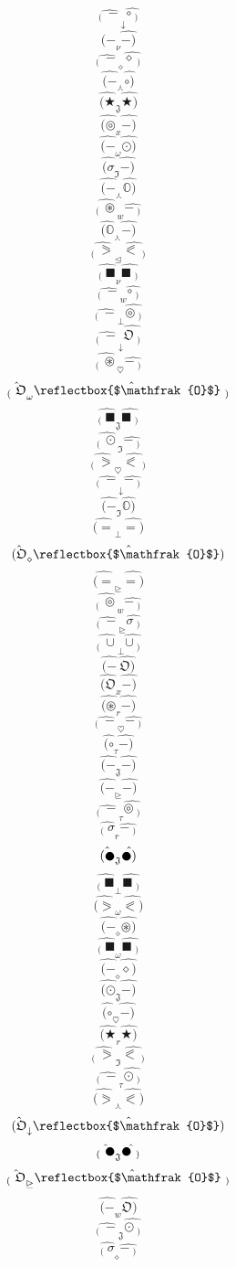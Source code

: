 \documentclass[12pt]{article}
\begin{document}
\begin{multicols}{5}
$$\hat{_( \ -} _\downarrow \hat{\circ\ _)}$$
$$\hat{(-} _\nu \hat{-)}$$
$$\hat{_( \ -} _\diamond \hat{\diamond\ _)}$$
$$\hat{(-} _\curlywedge \hat{\circ)}$$
$$\hat{(\bigstar} _\mathfrak{J} \hat{\bigstar)}$$
$$\hat{(\circledcirc} _x \hat{-)}$$
$$\hat{(-} _\omega \hat{\odot)}$$
$$\hat{(\sigma} _\mathfrak{I} \hat{-)}$$
$$\hat{(-} _\curlywedge \hat{\mathbb{O})}$$
$$\hat{_( \ \circledast} _w \hat{-\ _)}$$
$$\hat{(\mathbb{O}} _\curlywedge \hat{-)}$$
$$\hat{_( \ \eqslantgtr} _\trianglelefteq \hat{\eqslantless\ _)}$$
$$\hat{_( \ \blacksquare} _\nu \hat{\blacksquare\ _)}$$
$$\hat{_( \ -} _w \hat{\circ\ _)}$$
$$\hat{_( \ -} _\bot \hat{\circledcirc\ _)}$$
$$\hat{_( \ -} _\downarrow \hat{\mathfrak{O}\ _)}$$
$$\hat{_( \ \circledast} _\heartsuit \hat{-\ _)}$$
$$\hat{_( \ \mathfrak{O}} _\omega \hat{\reflectbox{$\mathfrak{O}$}\ _)}$$
$$\hat{_( \ \blacksquare} _\mathfrak{J} \hat{\blacksquare\ _)}$$
$$\hat{_( \ \odot} _\mathfrak{I} \hat{-\ _)}$$
$$\hat{_( \ \eqslantgtr} _\heartsuit \hat{\eqslantless\ _)}$$
$$\hat{_( \ -} _\downarrow \hat{-\ _)}$$
$$\hat{(-} _\mathfrak{I} \hat{\mathbb{O})}$$
$$\hat{(=} _\bot \hat{=)}$$
$$\hat{(\mathfrak{O}} _\diamond \hat{\reflectbox{$\mathfrak{O}$})}$$
$$\hat{(=} _\trianglerighteq \hat{=)}$$
$$\hat{_( \ \circledcirc} _w \hat{-\ _)}$$
$$\hat{_( \ -} _\trianglerighteq \hat{\sigma\ _)}$$
$$\hat{_( \ \cup} _\bot \hat{\cup\ _)}$$
$$\hat{(-} \  \hat{\mathfrak{O})}$$
$$\hat{(\mathfrak{O}} _x \hat{-)}$$
$$\hat{(\circledast} _r \hat{-)}$$
$$\hat{_( \ -} _\heartsuit \hat{-\ _)}$$
$$\hat{(\circ} _\tau \hat{-)}$$
$$\hat{(-} _\mathfrak{J} \hat{-)}$$
$$\hat{(-} _\trianglerighteq \hat{-)}$$
$$\hat{_( \ -} _\tau \hat{\circledcirc\ _)}$$
$$\hat{_( \ \sigma} _r \hat{-\ _)}$$
$$\hat{(\newmoon} _\mathfrak{J} \hat{\newmoon)}$$
$$\hat{_( \ \blacksquare} _\bot \hat{\blacksquare\ _)}$$
$$\hat{(\eqslantgtr} _\omega \hat{\eqslantless)}$$
$$\hat{(-} _\diamond \hat{\circledast)}$$
$$\hat{_( \ \blacksquare} _\omega \hat{\blacksquare\ _)}$$
$$\hat{(-} _\diamond \hat{\diamond)}$$
$$\hat{(\odot} _\mathfrak{J} \hat{-)}$$
$$\hat{(\circ} _\heartsuit \hat{-)}$$
$$\hat{(\bigstar} _r \hat{\bigstar)}$$
$$\hat{_( \ \eqslantgtr} _\mathfrak{I} \hat{\eqslantless\ _)}$$
$$\hat{_( \ -} _\tau \hat{\odot\ _)}$$
$$\hat{(\eqslantgtr} _\curlywedge \hat{\eqslantless)}$$
$$\hat{(\mathfrak{O}} _\downarrow \hat{\reflectbox{$\mathfrak{O}$})}$$
$$\hat{_( \ \newmoon} _\mathfrak{J} \hat{\newmoon\ _)}$$
$$\hat{_( \ \mathfrak{O}} _\trianglerighteq \hat{\reflectbox{$\mathfrak{O}$}\ _)}$$
$$\hat{(-} _w \hat{\mathfrak{O})}$$
$$\hat{_( \ -} _\mathfrak{J} \hat{\odot\ _)}$$
$$\hat{_( \ \sigma} _\diamond \hat{-\ _)}$$

\end{multicols}
\end{document}
